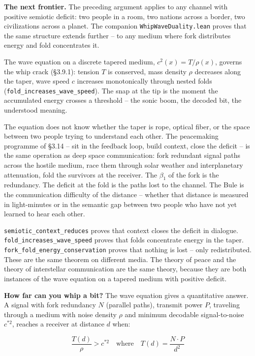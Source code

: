 \documentclass[
  11pt,
]{article}
\begin{document}
\textbf{The next frontier.} The preceding argument applies to any
channel with positive semiotic deficit: two people in a room, two
nations across a border, two civilizations across a planet. The
companion \texttt{WhipWaveDuality.lean} proves that the same structure
extends further -- to any medium where fork distributes energy and fold
concentrates it.

The wave equation on a discrete tapered medium,
\(c^2(x) = T / \rho(x)\), governs the whip crack (§3.9.1): tension \(T\)
is conserved, mass density \(\rho\) decreases along the taper, wave
speed \(c\) increases monotonically through nested folds
(\texttt{fold\_increases\_wave\_speed}). The snap at the tip is the
moment the accumulated energy crosses a threshold -- the sonic boom, the
decoded bit, the understood meaning.

The equation does not know whether the taper is rope, optical fiber, or
the space between two people trying to understand each other. The
peacemaking programme of §3.14 -- sit in the feedback loop, build
context, close the deficit -- is the same operation as deep space
communication: fork redundant signal paths across the hostile medium,
race them through solar weather and interplanetary attenuation, fold the
survivors at the receiver. The \(\beta_1\) of the fork is the
redundancy. The deficit at the fold is the paths lost to the channel.
The Bule is the communication difficulty of the distance -- whether that
distance is measured in light-minutes or in the semantic gap between two
people who have not yet learned to hear each other.

\texttt{semiotic\_context\_reduces} proves that context closes the
deficit in dialogue. \texttt{fold\_increases\_wave\_speed} proves that
folds concentrate energy in the taper.
\texttt{fork\_fold\_energy\_conservation} proves that nothing is lost --
only redistributed. These are the same theorem on different media. The
theory of peace and the theory of interstellar communication are the
same theory, because they are both instances of the wave equation on a
tapered medium with positive deficit.

\textbf{How far can you whip a bit?} The wave equation gives a
quantitative answer. A signal with fork redundancy \(N\) (parallel
paths), transmit power \(P\), traveling through a medium with noise
density \(\rho\) and minimum decodable signal-to-noise \(c^{*2}\),
reaches a receiver at distance \(d\) when:

\[\frac{T(d)}{\rho} > c^{*2} \quad \text{where} \quad T(d) = \frac{N \cdot P}{d^2}\]
\end{document}
